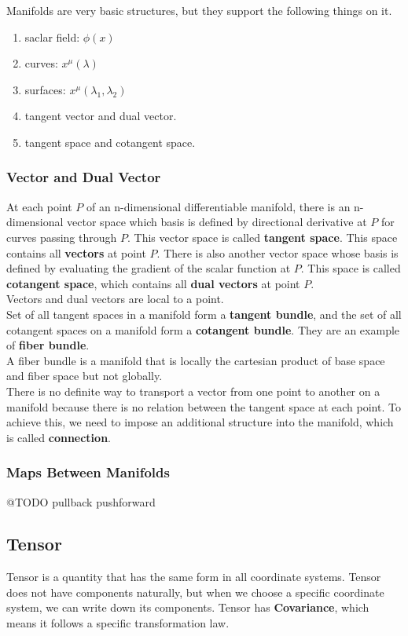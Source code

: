 \documentclass[12pt]{article}
\theoremstyle{mystyle}{\newtheorem{definition}{Definition}[section]}
\theoremstyle{mystyle}{\newtheorem{theorem}[definition]{Theorem}}
\theoremstyle{mystyle}{\newtheorem*{remark}{Remark}}
\theoremstyle{mystyle}{\newtheorem*{example}{Example}}
\theoremstyle{mystyle}{\newtheorem*{examples}{Examples}}
\theoremstyle{cstyle}{\newtheorem*{cthm}{}}
\begin{document}
Manifolds are very basic structures, but they support the following things on it.
\begin{enumerate}
  \item saclar field: \(\phi(x)\)
  \item curves: \(x^{\mu}(\lambda)\)
  \item surfaces: \(x^{\mu}(\lambda_1, \lambda_2)\)
  \item tangent vector and dual vector.
  \item tangent space and cotangent space.
\end{enumerate}

\subsubsection{Vector and Dual Vector}
At each point $P$ of an n-dimensional differentiable manifold, there is an n-dimensional vector space
which basis is defined by directional derivative at $P$ for curves passing through $P$.
This vector space is called \textbf{tangent space}. This space contains all \textbf{vectors} at point $P$.
There is also another vector space whose basis is defined by evaluating the gradient of the scalar function at $P$.
This space is called \textbf{cotangent space}, which contains all \textbf{dual vectors} at point $P$.\\
Vectors and dual vectors are local to a point.\\
Set of all tangent spaces in a manifold form a \textbf{tangent bundle}, and the set of all cotangent spaces on a manifold
form a \textbf{cotangent bundle}. They are an example of \textbf{fiber bundle}.\\
A fiber bundle is a manifold that is locally the cartesian product of base space and fiber space but not globally.\\
There is no definite way to transport a vector from one point to another on a manifold
because there is no relation between the tangent space at each point. To achieve this,
we need to impose an additional structure into the manifold, which is called \textbf{connection}.


\subsubsection{Maps Between Manifolds}
@TODO
pullback
pushforward


\subsection{Tensor}
Tensor is a quantity that has the same form in all coordinate systems.
Tensor does not have components naturally, but when we choose a specific coordinate system, we can write down its components.
Tensor has \textbf{Covariance}, which means it follows a specific transformation law.
\end{document}
